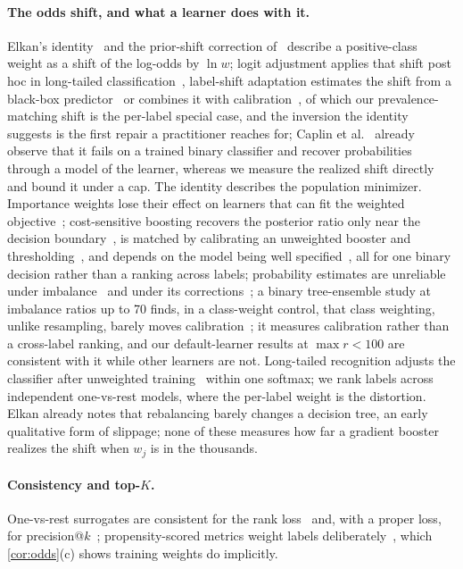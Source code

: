 \documentclass[sigconf,nonacm]{acmart}
\begin{document}
\paragraph{The odds shift, and what a learner does with it.} Elkan's identity~\cite{Elkan2001} and the prior-shift correction of~\cite{Saerens2002} describe a positive-class weight as a shift of the log-odds by $\ln w$; logit adjustment applies that shift post hoc in long-tailed classification~\cite{Menon2021LogitAdjust}, label-shift adaptation estimates the shift from a black-box predictor~\cite{Lipton2018LabelShift} or combines it with calibration~\cite{Alexandari2020MLLS}, of which our prevalence-matching shift is the per-label special case, and the inversion the identity suggests is the first repair a practitioner reaches for; Caplin et al.~\cite{Caplin2022ClassWeights} already observe that it fails on a trained binary classifier and recover probabilities through a model of the learner, whereas we measure the realized shift directly and bound it under a cap. The identity describes the population minimizer. Importance weights lose their effect on learners that can fit the weighted objective~\cite{Byrd2019}; cost-sensitive boosting recovers the posterior ratio only near the decision boundary~\cite{MasnadiShirazi2011CSBoost}, is matched by calibrating an unweighted booster and thresholding~\cite{Nikolaou2016CSBoost}, and depends on the model being well specified~\cite{Dmochowski2010CostSensitive}, all for one binary decision rather than a ranking across labels; probability estimates are unreliable under imbalance~\cite{Wallace2012} and under its corrections~\cite{VandenGoorbergh2022}; a binary tree-ensemble study at imbalance ratios up to 70 finds, in a class-weight control, that class weighting, unlike resampling, barely moves calibration~\cite{Liu2026Resampling}; it measures calibration rather than a cross-label ranking, and our default-learner results at $\max r<100$ are consistent with it while other learners are not. Long-tailed recognition adjusts the classifier after unweighted training~\cite{Kang2020Decoupling,Menon2021LogitAdjust} within one softmax; we rank labels across independent one-vs-rest models, where the per-label weight is the distortion. Elkan already notes that rebalancing barely changes a decision tree, an early qualitative form of slippage; none of these measures how far a gradient booster~\cite{Friedman2001GBM} realizes the shift when $w_j$ is in the thousands.

\paragraph{Consistency and top-$K$.} One-vs-rest surrogates are consistent for the rank loss~\cite{Dembczynski2012Univariate} and, with a proper loss, for precision@$k$~\cite{Menon2019Reductions,Wydmuch2018PLT}; propensity-scored metrics weight labels deliberately~\cite{Jain2016XMLLoss}, which \cref{cor:odds}(c) shows training weights do implicitly.
\end{document}
